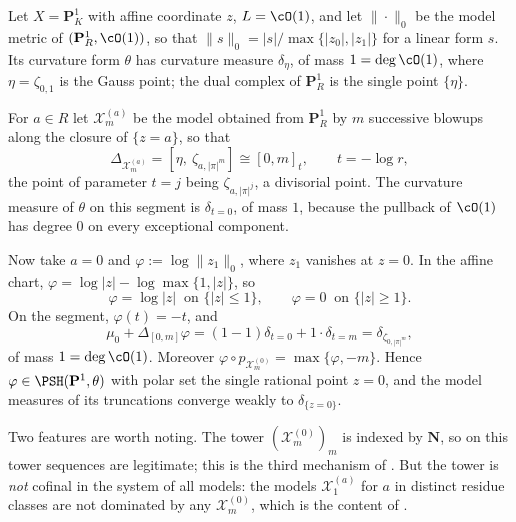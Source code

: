 \begin{example}
\label{ex:ch21-p1-refinement}
Let $X=\mathbf P^1_K$ with affine coordinate $z$, $L=\cO(1)$, and let
$\|\cdot\|_0$ be the model metric of
$(\mathbf P^1_R,\cO(1))$, so that
$\lVert s\rVert_0=|s|/\max\{|z_0|,|z_1|\}$ for a linear form $s$.  Its
curvature form $\theta$ has curvature measure
$\delta_\eta$, of mass $1=\deg\cO(1)$, where $\eta=\zeta_{0,1}$ is the
Gauss point; the dual complex of $\mathbf P^1_R$ is the single point
$\{\eta\}$.

For $a\in R$ let $\mathcal X_m^{(a)}$ be the model obtained from
$\mathbf P^1_R$ by $m$ successive blowups along the closure of
$\{z=a\}$, so that
\[
 \Delta_{\mathcal X^{(a)}_m}=[\eta,\ \zeta_{a,|\pi|^m}]
 \cong[0,m]_t,
 \qquad t=-\log r,
\]
the point of parameter $t=j$ being $\zeta_{a,|\pi|^{j}}$, a divisorial
point.  The curvature measure of $\theta$ on this segment is
$\delta_{t=0}$, of mass $1$, because the pullback of $\cO(1)$ has
degree $0$ on every exceptional component.

Now take $a=0$ and $\varphi:=\log\lVert z_1\rVert_0$, where $z_1$
vanishes at $z=0$.  In the affine chart,
$\varphi=\log|z|-\log\max\{1,|z|\}$, so
\[
 \varphi=\log|z|\ \text{ on }\{|z|\leq1\},
 \qquad
 \varphi=0\ \text{ on }\{|z|\geq1\}.
\]
On the segment, $\varphi(t)=-t$, and
\[
 \mu_0+\Delta_{[0,m]}\varphi
 =(1-1)\delta_{t=0}+1\cdot\delta_{t=m}
 =\delta_{\zeta_{0,|\pi|^m}},
\]
of mass $1=\deg\cO(1)$.  Moreover
$\varphi\circ p_{\mathcal X^{(0)}_m}=\max\{\varphi,-m\}$.  Hence
$\varphi\in\PSH(\mathbf P^1,\theta)$ with polar set the single rational
point $z=0$, and the model measures of its truncations converge weakly to
$\delta_{\{z=0\}}$.

Two features are worth noting.  The tower $(\mathcal X^{(0)}_m)_m$ is
indexed by $\mathbf N$, so on this tower sequences are legitimate; this is
the third mechanism of .  But the tower is
\emph{not} cofinal in the system of all models: the models
$\mathcal X^{(a)}_1$ for $a$ in distinct residue classes are not
dominated by any $\mathcal X^{(0)}_m$, which is the content of
.
\end{example}

